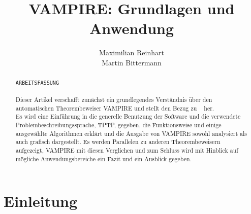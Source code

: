 \documentclass{article}
\author{
	Maximilian Reinhart\\
	Martin Bittermann
}
\title{VAMPIRE: Grundlagen und Anwendung}
\begin{document}
\maketitle

\begin{abstract}
	\texttt{ARBEITSFASSUNG}\\
	\\
	Dieser Artikel verschafft zunächst ein grundlegendes Verständnis über den automatischen Theorembeweiser VAMPIRE und
	stellt den Bezug zu ~\cite{cav2013} her. \\
	Es wird eine Einführung in die generelle Benutzung der Software und die verwendete Problembeschreibungssprache, TPTP, gegeben, 
	die Funktionsweise und einige ausgewählte Algorithmen erklärt und
	die Ausgabe von VAMPIRE sowohl analysiert als auch grafisch dargestellt.
	Es werden Parallelen zu anderen Theorembeweisern aufgezeigt, VAMPIRE mit diesen Verglichen 
	und zum Schluss wird mit Hinblick auf mögliche Anwendungsbereiche ein Fazit und ein Ausblick gegeben.
\end{abstract}


\section{Einleitung}
\label{sec:introduction}
\end{document}
